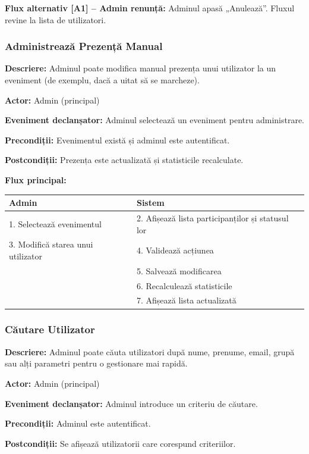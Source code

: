 \documentclass[11pt]{article}
\begin{document}
\textbf{Flux alternativ [A1] – Admin renunță:}  \newline
Adminul apasă „Anulează”. Fluxul revine la lista de utilizatori.

\subsubsection{Administrează Prezență Manual}


\textbf{Descriere:} Adminul poate modifica manual prezența unui utilizator la un eveniment (de exemplu, dacă a uitat să se marcheze).

\textbf{Actor:} Admin (principal)

\textbf{Eveniment declanșator:} Adminul selectează un eveniment pentru administrare.

\textbf{Precondiții:} Evenimentul există și adminul este autentificat.

\textbf{Postcondiții:} Prezența este actualizată și statisticile recalculate.

\textbf{Flux principal:}

\begin{tabular}{l l}
\hline
\textbf{Admin} & \textbf{Sistem} \\
\hline
1. Selectează evenimentul & 2. Afișează lista participanților și statusul lor \\
3. Modifică starea unui utilizator & 4. Validează acțiunea \\
 & 5. Salvează modificarea \\
 & 6. Recalculează statisticile \\
 & 7. Afișează lista actualizată \\
\hline
\end{tabular}

\subsubsection{Căutare Utilizator}


\textbf{Descriere:} Adminul poate căuta utilizatori după nume, prenume, email, grupă sau alți parametri pentru o gestionare mai rapidă.

\textbf{Actor:} Admin (principal)

\textbf{Eveniment declanșator:} Adminul introduce un criteriu de căutare.

\textbf{Precondiții:} Adminul este autentificat.

\textbf{Postcondiții:} Se afișează utilizatorii care corespund criteriilor.
\end{document}
